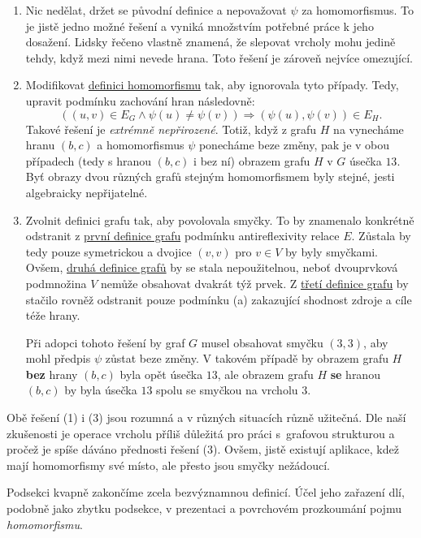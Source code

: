 \begin{enumerate}
 \item Nic nedělat, držet se původní definice a nepovažovat $\psi$ za
  homomorfismus. To je jistě jedno možné řešení a vyniká množstvím potřebné
  práce k jeho dosažení. Lidsky řečeno vlastně znamená, že slepovat vrcholy mohu
  jedině tehdy, když mezi nimi nevede hrana. Toto řešení je zároveň nejvíce
  omezující.
 \item Modifikovat \hyperref[def:grafovy-homomorfismus]{definici homomorfismu}
  tak, aby ignorovala tyto případy. Tedy, upravit podmínku zachování hran
  následovně:
  \[
   ((u,v) \in E_G \wedge \psi(u) \neq \psi(v)) \Rightarrow (\psi(u),\psi(v)) \in
   E_H.
  \]
  Takové řešení je \emph{extrémně nepřirozené}. Totiž, když z grafu $H$ na
   vynecháme hranu $(b,c)$ a homomorfismus $\psi$
  ponecháme beze změny, pak je v obou případech (tedy s hranou $(b,c)$ i bez ní)
  obrazem grafu $H$ v $G$ úsečka $13$. Byť obrazy dvou různých grafů stejným
  homomorfismem byly stejné, jesti algebraicky nepřijatelné.
 \item Zvolnit definici grafu tak, aby povolovala smyčky. To by znamenalo
  konkrétně odstranit z \hyperref[def:graf-poprve]{první definice grafu}
  podmínku antireflexivity relace $E$. Zůstala by tedy pouze symetrickou a
  dvojice $(v,v)$ pro $v \in V$ by byly smyčkami. Ovšem,
  \hyperref[def:graf-podruhe]{druhá definice grafů} by se stala nepoužitelnou,
  neboť dvouprvková podmnožina $V$ nemůže obsahovat dvakrát týž prvek. Z
  \hyperref[def:graf-potreti]{třetí definice grafu} by stačilo rovněž odstranit
  pouze podmínku (a) zakazující shodnost zdroje a cíle téže hrany.

  Při adopci tohoto řešení by graf $G$ musel obsahovat smyčku $(3,3)$, aby mohl
  předpis $\psi$ zůstat beze změny. V takovém případě by obrazem grafu $H$
  \textbf{bez} hrany $(b,c)$ byla opět úsečka $13$, ale obrazem grafu $H$
  \textbf{se} hranou $(b,c)$ by byla úsečka $13$ spolu se smyčkou na vrcholu
  $3$.
\end{enumerate}
Obě řešení (1) i (3) jsou rozumná a v různých situacích různě užitečná. Dle naší
zkušenosti je operace  vrcholu příliš důležitá pro práci s~grafovou
strukturou a pročež je spíše dáváno přednosti řešení (3). Ovšem, jistě existují
aplikace, kdež mají homomorfismy své místo, ale přesto jsou smyčky nežádoucí.

Podsekci kvapně zakončíme zcela bezvýznamnou definicí. Účel jeho zařazení dlí,
podobně jako zbytku podsekce, v prezentaci a povrchovém prozkoumání pojmu
\emph{homomorfismu}.

